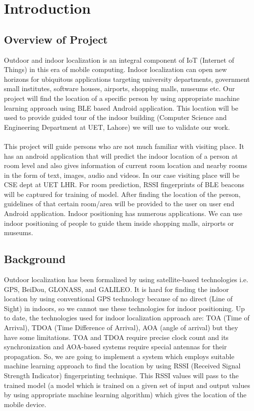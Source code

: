 \documentclass{article}
\begin{document}
\section{Introduction}

\subsection{Overview of Project}
Outdoor and indoor localization is an integral component of  IoT (Internet of Things) in this era of mobile computing. Indoor localization can open new horizons for ubiquitous applications targeting university departments, government small institutes, software houses, airports, shopping malls, museums etc. Our project will find the location of a specific person by using appropriate machine learning approach using BLE based Android application. This location will be used to provide guided tour of the indoor building (Computer Science and Engineering Department at UET, Lahore) we will use to validate our work. 
\\\\
This project will guide persons who are not much familiar with visiting place. It has an android application that will predict the indoor location of a person at room level and also gives information of current room location and nearby rooms in the form of text, images, audio and videos. In our case visiting place will be CSE dept at UET LHR. For room prediction, RSSI fingerprints of BLE beacons will be captured for training of model. After finding the location of the person, guidelines of that certain room/area will be provided to the user on user end Android application. Indoor positioning has numerous applications. We can use indoor positioning of people to guide them inside shopping malls, airports or museums. 



\subsection{Background}
Outdoor localization has been formalized by using satellite-based technologies i.e. GPS\cite{GPS}, BeiDou\cite{cooper2016loco}, GLONASS\cite{cooper2016loco}, and GALILEO\cite{GALILEO}. It is hard for finding the indoor location by using conventional GPS technology because of no direct (Line of Sight)\cite{akram2018censloc} in indoors, so we cannot use these technologies for indoor positioning. Up to date, the technologies used for indoor localization approach are: TOA (Time of Arrival), TDOA (Time Difference of Arrival), AOA (angle of arrival) but they have some limitations. TOA and TDOA require precise clock count and its synchronization and AOA-based systems require special antennas for their propagation. So, we are going to implement a system which employs suitable machine learning approach to find the location by using RSSI (Received Signal Strength Indicator) fingerprinting technique. This RSSI values will pass to the trained model (a model which is trained on a given set of input and output values by using appropriate machine learning algorithm) which gives the location of the mobile device.
\end{document}
